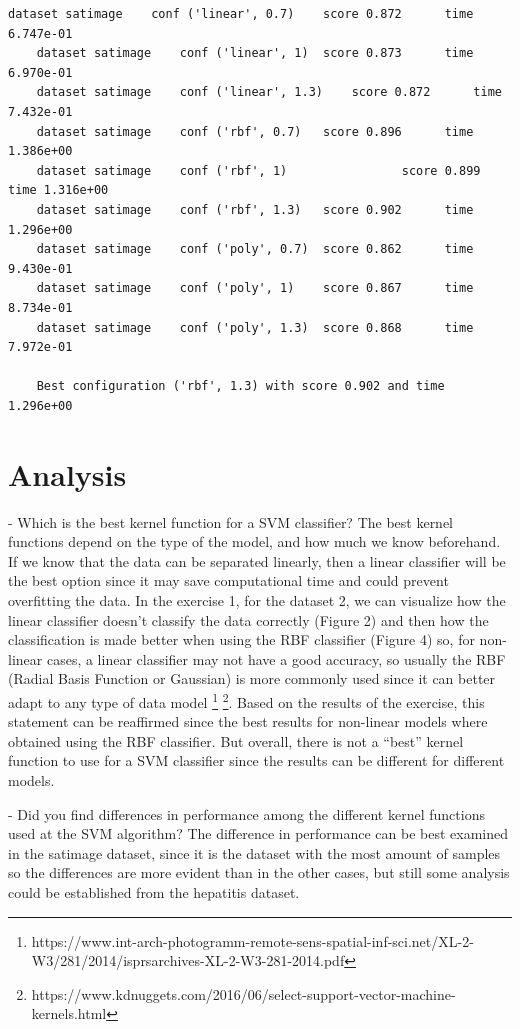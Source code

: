\documentclass[12pt,a4paper]{article}
\begin{document}
\begin{lstlisting}[caption=Result of exercise 2 with satimage dataset]
	dataset satimage 	conf ('linear', 0.7) 	score 0.872 	 time 6.747e-01
	dataset satimage 	conf ('linear', 1) 	score 0.873 	 time 6.970e-01
	dataset satimage 	conf ('linear', 1.3) 	score 0.872 	 time 7.432e-01
	dataset satimage 	conf ('rbf', 0.7) 	score 0.896 	 time 1.386e+00
	dataset satimage 	conf ('rbf', 1) 	           score 0.899 	 time 1.316e+00
	dataset satimage 	conf ('rbf', 1.3) 	score 0.902 	 time 1.296e+00
	dataset satimage 	conf ('poly', 0.7) 	score 0.862 	 time 9.430e-01
	dataset satimage 	conf ('poly', 1) 	score 0.867 	 time 8.734e-01
	dataset satimage 	conf ('poly', 1.3) 	score 0.868 	 time 7.972e-01

	Best configuration ('rbf', 1.3) with score 0.902 and time 1.296e+00	
\end{lstlisting}

\section*{Analysis}

- Which is the best kernel function for a SVM classifier?
The best kernel functions depend on the type of the model, and how much we know beforehand.
If we know that the data can be separated linearly, then a linear classifier will be the
best option since it may save computational time and could prevent overfitting the data. 
In the exercise 1, for the dataset 2, we can visualize how the linear classifier doesn’t 
classify the data correctly (Figure 2) and then how the classification is made better when 
using the RBF classifier (Figure 4) so, for non-linear cases, a linear classifier may not 
have a good accuracy, so usually the RBF (Radial Basis Function or Gaussian) is more commonly 
used since it can better adapt to any type of data model \footnote{https://www.int-arch-photogramm-remote-sens-spatial-inf-sci.net/XL-2-W3/281/2014/isprsarchives-XL-2-W3-281-2014.pdf} \footnote{https://www.kdnuggets.com/2016/06/select-support-vector-machine-kernels.html}. Based on the results of the exercise, 
this statement can be reaffirmed since the best results for non-linear models where obtained 
using the RBF classifier. But overall, there is not a “best” kernel function to use for a 
SVM classifier since the results can be different for different models. 

- Did you find differences in performance among the different kernel functions used at 
the SVM algorithm?
The difference in performance can be best examined in the satimage dataset, since it is 
the dataset with the most amount of samples so the differences are more evident than in the 
other cases, but still some analysis could be established from the hepatitis dataset.
\end{document}
